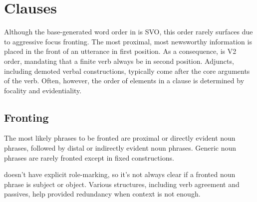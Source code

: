 \setchapterpreamble[u]{\margintoc}
\chapter{Clauses}
Although the base-generated word order in \langname{} is SVO, this order rarely surfaces due to aggressive focus fronting. The most proximal, most newsworthy information is placed in the front of an utterance in first position. As a consequence, \langname{} is V2 order, mandating that a finite verb always be in second position. Adjuncts, including demoted verbal constructions, typically come after the core arguments of the verb.  Often, however, the order of elements in a clause is determined by focality and evidentiality.

\section{Fronting}
The most likely phrases to be fronted are proximal or directly evident noun phrases, followed by distal or indirectly evident noun phrases. Generic noun phrases are rarely fronted except in fixed constructions.

\langname{} doesn't have explicit role-marking, so it's not always clear if a fronted noun phrase is subject or object. Various structures, including verb agreement and passives, help provided redundancy when context is not enough.



